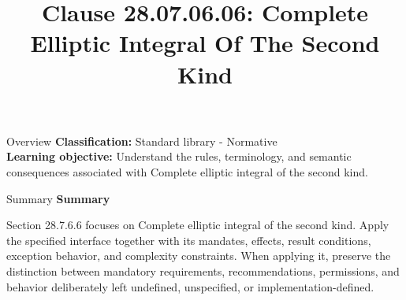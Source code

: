 \documentclass[10pt,letterpaper]{article}
\title{Clause 28.07.06.06: Complete Elliptic Integral Of The Second Kind}
\author{}
\date{}
\begin{document}
\maketitle
\begin{CornellOverviewBox}{Overview}
\textbf{Classification:} Standard library - Normative\\[2pt]
\textbf{Learning objective:} Understand the rules, terminology, and semantic consequences associated with Complete elliptic integral of the second kind.
\end{CornellOverviewBox}\begin{CornellSummaryBox}{Summary}
{\sffamily\bfseries\color{Accent} Summary}\par\vspace{3pt}Section 28.7.6.6 focuses on Complete elliptic integral of the second kind. Apply the specified interface together with its mandates, effects, result conditions, exception behavior, and complexity constraints. When applying it, preserve the distinction between mandatory requirements, recommendations, permissions, and behavior deliberately left undefined, unspecified, or implementation-defined.
\end{CornellSummaryBox}
\end{document}
